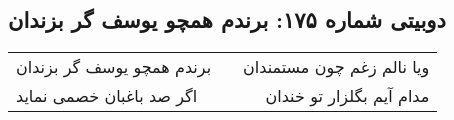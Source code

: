 \begin{center}
\section*{دوبیتی شماره ۱۷۵: برندم همچو یوسف گر بزندان}
\label{sec:175}
\begin{longtable}{l p{0.5cm} r}
برندم همچو یوسف گر بزندان
&&
ویا نالم زغم چون مستمندان
\\
اگر صد باغبان خصمی نماید
&&
مدام آیم بگلزار تو خندان
\\
\end{longtable}
\end{center}
